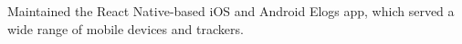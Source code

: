 			\item Maintained the React Native-based iOS and Android Elogs app, which served a wide range of mobile devices and trackers.